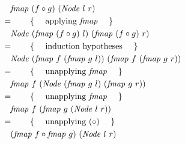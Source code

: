 \begin{parts}
\begin{solution}
\begin{align*}
&\quad \mathit{fmap}~(f \circ g)~(\mathit{Node}~l~r)\\
&=\qquad\text{\{\quad\ applying $\mathit{fmap}$ \quad\}}\\
&\quad \mathit{Node}~(\mathit{fmap}~(f \circ g)~l)~(\mathit{fmap}~(f \circ g)~r)\\
&=\qquad\text{\{\quad\ induction hypotheses \quad\}}\\
&\quad \mathit{Node}~(\mathit{fmap}~f~(\mathit{fmap}~g~l))~(\mathit{fmap}~f~(\mathit{fmap}~g~r))\\
&=\qquad\text{\{\quad\ unapplying $\mathit{fmap}$ \quad\}}\\
&\quad \mathit{fmap}~f~(\mathit{Node}~(\mathit{fmap}~g~l)~(\mathit{fmap}~g~r))\\
&=\qquad\text{\{\quad\ unapplying $\mathit{fmap}$ \quad\}}\\
&\quad \mathit{fmap}~f~(\mathit{fmap}~g~(\mathit{Node}~l~r))\\
&=\qquad\text{\{\quad\ unapplying $(\circ)$ \quad\}}\\
&\quad (\mathit{fmap}~f \circ \mathit{fmap}~g)~(\mathit{Node}~l~r)
\end{align*}
~
\end{solution}
\end{parts}
